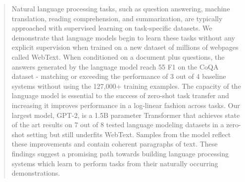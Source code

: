 \documentclass{article}
\begin{document}
\begin{abstract}

Natural language processing tasks, such as question answering, machine translation, reading comprehension, and summarization, are typically approached with supervised learning on task-specific datasets.
We demonstrate that language models begin to learn these tasks without any explicit supervision when trained on a new dataset of millions of webpages called WebText. When conditioned on a document plus questions, the answers generated by the language model reach 55 F1 on the CoQA dataset - matching or exceeding the performance of 3 out of 4 baseline systems without using the 127,000+ training examples. The capacity of the language model is essential to the success of zero-shot task transfer and increasing it improves performance in a log-linear fashion across tasks. Our largest model, GPT-2, is a 1.5B parameter Transformer that achieves state of the art results on 7 out of 8 tested language modeling datasets in a zero-shot setting but still underfits WebText. Samples from the model reflect these improvements and contain coherent paragraphs of text. These findings suggest a promising path towards building language processing systems which learn to perform tasks from their naturally occurring demonstrations.



\end{abstract}
\end{document}
